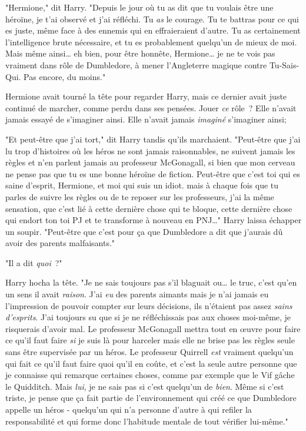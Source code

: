 "Hermione," dit Harry. "Depuis le jour où tu as dit que tu voulais être une héroïne, je t'ai observé et j'ai réfléchi. Tu \emph{as} le courage. Tu te battras pour ce qui es juste, même face à des ennemis qui en effraieraient d'autre. Tu as certainement l'intelligence brute nécessaire, et tu es probablement quelqu'un de mieux de moi. Mais même ainsi… eh bien, pour être honnête, Hermione… je ne te vois pas vraiment dans rôle de Dumbledore, à mener l'Angleterre magique contre Tu-Sais-Qui. Pas encore, du moins."

Hermione avait tourné la tête pour regarder Harry, mais ce dernier avait juste continué de marcher, comme perdu dans ses pensées. Jouer \emph{ce} rôle~? Elle n'avait jamais essayé de s'imaginer ainsi. Elle n'avait jamais \emph{imaginé} s'imaginer ainsi;

"Et peut-être que j'ai tort," dit Harry tandis qu'ils marchaient. "Peut-être que j'ai lu trop d'histoires où les héros ne sont jamais raisonnables, ne suivent jamais les règles et n'en parlent jamais au professeur McGonagall, si bien que mon cerveau ne pense pas que tu es une bonne héroïne de fiction. Peut-être que c'est toi qui es saine d'esprit, Hermione, et moi qui suis un idiot. mais à chaque fois que tu parles de suivre les règles ou de te reposer sur les professeurs, j'ai la même sensation, que c'est lié à cette dernière chose qui te bloque, cette dernière chose qui endort ton toi PJ et te transforme à nouveau en PNJ…" Harry laissa échapper un soupir. "Peut-être que c'est pour ça que Dumbledore a dit que j'aurais dû avoir des parents malfaisants."

"Il a dit \emph{quoi}~?"

Harry hocha la tête. "Je ne sais toujours pas s'il blaguait ou… le truc, c'est qu'en un sens il avait \emph{raison}. J'ai \emph{eu} des parents aimants mais je n'ai jamais eu l'impression de pouvoir compter sur leurs décisions, ils n'étaient pas assez \emph{sains d'esprits}. J'ai toujours su que si je ne réfléchissais pas aux choses moi-même, je risquerais d'avoir mal. Le professeur McGonagall mettra tout en œuvre pour faire ce qu'il faut faire \emph{si} je suis là pour harceler mais elle ne brise pas les règles seule sans être supervisée par un héros. Le professeur Quirrell \emph{est} vraiment quelqu'un qui fait ce qu'il faut faire quoi qu'il en coûte, et c'est la seule autre personne que je connaisse qui remarque certaines choses, comme par exemple que le Vif gâche le Quidditch. Mais \emph{lui}, je ne sais pas si c'est quelqu'un de \emph{bien}. Même si c'est triste, je pense que ça fait partie de l'environnement qui créé ce que Dumbledore appelle un héros - quelqu'un qui n'a personne d'autre à qui refiler la responsabilité et qui forme donc l'habitude mentale de tout vérifier lui-même."

